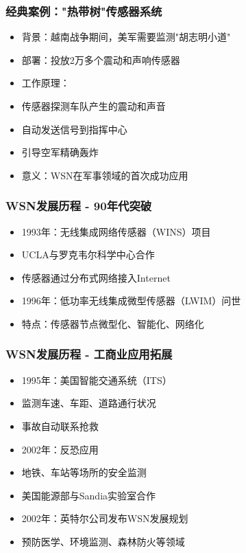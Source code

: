 \documentclass[aspectratio=43]{beamer}
\begin{document}
\begin{frame}
  \frametitle{经典案例："热带树"传感器系统}

  \begin{itemize}
  \item<+-> 背景：越南战争期间，美军需要监测"胡志明小道"
  \item<+-> 部署：投放2万多个震动和声响传感器
  \item<+-> 工作原理：
  \item<+-> 传感器探测车队产生的震动和声音
  \item<+-> 自动发送信号到指挥中心
  \item<+-> 引导空军精确轰炸
  \item<+-> 意义：WSN在军事领域的首次成功应用
  \end{itemize}
\end{frame}

\begin{frame}
  \frametitle{WSN发展历程 - 90年代突破}

  \begin{itemize}
  \item<+-> 1993年：无线集成网络传感器（WINS）项目
  \item<+-> UCLA与罗克韦尔科学中心合作
  \item<+-> 传感器通过分布式网络接入Internet
  \item<+-> 1996年：低功率无线集成微型传感器（LWIM）问世
  \item<+-> 特点：传感器节点微型化、智能化、网络化
  \end{itemize}
\end{frame}

\begin{frame}
  \frametitle{WSN发展历程 - 工商业应用拓展}

  \begin{itemize}
  \item<+-> 1995年：美国智能交通系统（ITS）
  \item<+-> 监测车速、车距、道路通行状况
  \item<+-> 事故自动联系抢救
  \item<+-> 2002年：反恐应用
  \item<+-> 地铁、车站等场所的安全监测
  \item<+-> 美国能源部与Sandia实验室合作
  \item<+-> 2002年：英特尔公司发布WSN发展规划
  \item<+-> 预防医学、环境监测、森林防火等领域
  \end{itemize}
\end{frame}
\end{document}
